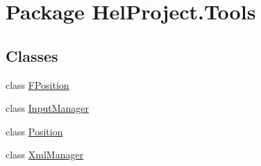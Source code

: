 \hypertarget{namespace_hel_project_1_1_tools}{}\section{Package Hel\+Project.\+Tools}
\label{namespace_hel_project_1_1_tools}
\subsection*{Classes}
\begin{DoxyCompactItemize}
\item 
class \hyperlink{class_hel_project_1_1_tools_1_1_f_position}{F\+Position}
\item 
class \hyperlink{class_hel_project_1_1_tools_1_1_input_manager}{Input\+Manager}
\item 
class \hyperlink{class_hel_project_1_1_tools_1_1_position}{Position}
\item 
class \hyperlink{class_hel_project_1_1_tools_1_1_xml_manager}{Xml\+Manager}
\end{DoxyCompactItemize}

